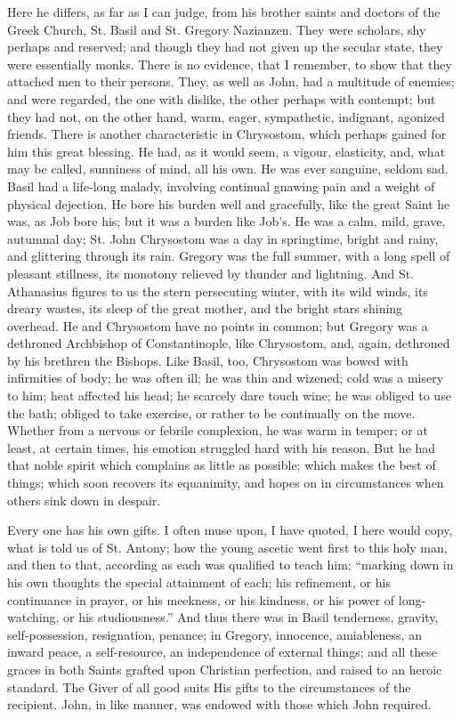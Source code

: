 Here he differs, as far as I can judge, from his brother saints and
doctors of the Greek Church, St. Basil and St. Gregory Nazianzen. They
were scholars, shy perhaps and reserved; and though they had not given
up the secular state, they were essentially monks. There is no
evidence, that I remember, to show that they attached men to their
persons. They, as well as John, had a multitude of enemies; and were
regarded, the one with dislike, the other perhaps with contempt; but
they had not, on the other hand, warm, eager, sympathetic, indignant,
agonized friends. There is another characteristic in Chrysostom, which
perhaps gained for him this great blessing. He had, as it would seem,
a vigour, elasticity, and, what may be called, sunniness of mind, all
his own. He was ever sanguine, seldom sad. Basil had a life-long
malady, involving continual gnawing pain and a weight of physical
dejection. He bore his burden well and gracefully, like the great
Saint he was, as Job bore his; but it was a burden like Job's. He was
a calm, mild, grave, autumnal day; St. John Chrysostom was a day in
springtime, bright and rainy, and glittering through its rain. Gregory
was the full summer, with a long spell of pleasant stillness, its
monotony relieved by thunder and lightning. And St. Athanasius
figures to us the stern persecuting winter, with its wild winds, its
dreary wastes, its sleep of the great mother, and the bright stars
shining overhead. He and Chrysostom have no points in common; but
Gregory was a dethroned Archbishop of Constantinople, like Chrysostom,
and, again, dethroned by his brethren the Bishops. Like Basil, too,
Chrysostom was bowed with infirmities of body; he was often ill; he
was thin and wizened; cold was a misery to him; heat affected his
head; he scarcely dare touch wine; he was obliged to use the bath;
obliged to take exercise, or rather to be continually on the move.
Whether from a nervous or febrile complexion, he was warm in temper;
or at least, at certain times, his emotion struggled hard with his
reason. But he had that noble spirit which complains as little as
possible; which makes the best of things; which soon recovers its
equanimity, and hopes on in circumstances when others sink down in
despair.

Every one has his own gifts. I often muse upon, I have quoted, I
here would copy, what is told us of St. Antony; how the young ascetic
went first to this holy man, and then to that, according as each was
qualified to teach him; ``marking down in his own thoughts the
special attainment of each; his refinement, or his continuance in
prayer, or his meekness, or his kindness, or his power of
long-watching, or his studiousness.'' And thus there was in Basil
tenderness, gravity, self-possession, resignation, penance; in
Gregory, innocence, amiableness, an inward peace, a self-resource, an
independence of external things; and all these graces in both Saints
grafted upon Christian perfection, and raised to an heroic standard.
The Giver of all good suits His gifts to the circumstances of the
recipient. John, in like manner, was endowed with those which
John required.

